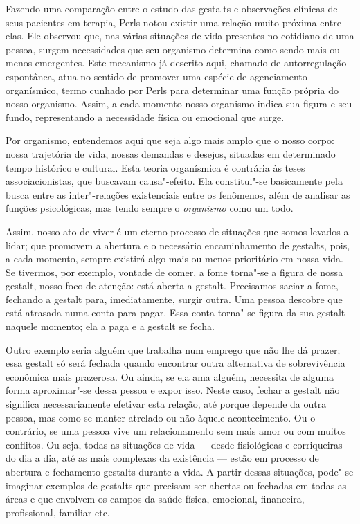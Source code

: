 Fazendo uma comparação entre o estudo das gestalts e observações
clínicas de seus pacientes em terapia, Perls notou existir uma relação
muito próxima entre elas. Ele observou que, nas várias situações de vida
presentes no cotidiano de uma pessoa, surgem necessidades que seu
organismo determina como sendo mais ou menos emergentes. Este mecanismo
já descrito aqui, chamado de autorregulação espontânea, atua no sentido
de promover uma espécie de agenciamento organísmico, termo cunhado por
Perls para determinar uma função própria do nosso organismo. Assim, a
cada momento nosso organismo indica sua figura e seu fundo,
representando a necessidade física ou emocional que surge.

Por organismo, entendemos aqui que seja algo mais amplo que o nosso
corpo: nossa trajetória de vida, nossas demandas e desejos,
situadas em determinado tempo histórico e cultural. Esta teoria
organísmica é contrária às teses associacionistas, que buscavam
causa"-efeito. Ela constitui"-se basicamente pela busca entre as
inter"-relações existenciais entre os fenômenos, além de analisar as
funções psicológicas, mas tendo sempre o \emph{organismo} como um todo.

Assim, nosso ato de viver é um eterno processo de situações que somos
levados a lidar; que promovem a abertura e o necessário encaminhamento
de gestalts, pois, a cada momento, sempre existirá algo mais ou menos
prioritário em nossa vida. Se tivermos, por exemplo, vontade de comer, a
fome torna"-se a figura de nossa gestalt, nosso foco de atenção: está
aberta a gestalt. Precisamos saciar a fome, fechando a gestalt para,
imediatamente, surgir outra. Uma pessoa descobre que está atrasada numa
conta para pagar. Essa conta torna"-se figura da sua gestalt naquele
momento; ela a paga e a gestalt se fecha.

Outro exemplo seria alguém que trabalha num emprego que não lhe dá
prazer; essa gestalt só será fechada quando encontrar outra alternativa
de sobrevivência econômica mais prazerosa. Ou ainda, se ela ama alguém,
necessita de alguma forma aproximar"-se dessa pessoa e expor isso. Neste
caso, fechar a gestalt não significa necessariamente efetivar esta
relação, até porque depende da outra pessoa, mas como se manter atrelado
ou não àquele acontecimento. Ou o contrário, se uma pessoa vive um
relacionamento sem mais amor ou com muitos conflitos. Ou seja, todas as
situações de vida --- desde fisiológicas e corriqueiras do dia a dia, até
as mais complexas da existência --- estão em processo de abertura e
fechamento gestalts durante a vida. A partir dessas situações, pode"-se
imaginar exemplos de gestalts que precisam ser abertas ou fechadas em
todas as áreas e que envolvem os campos da saúde física, emocional,
financeira, profissional, familiar etc.

